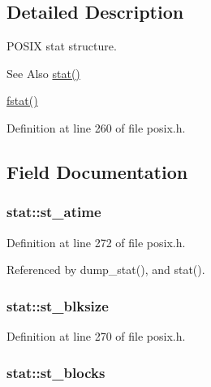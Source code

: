 \subsection{Detailed Description}
P\-O\-S\-I\-X stat structure. 

\begin{DoxySeeAlso}{See Also}
\hyperlink{posix_8c_abef70bf7a4af8a1f4998db0035c51781}{stat()} 

\hyperlink{posix_8h_a85e86e70773c0a204346f965272bd364}{fstat()} 
\end{DoxySeeAlso}


Definition at line 260 of file posix.\-h.



\subsection{Field Documentation}
\hypertarget{structstat_ab74d1e7e345e88b9d0fb2688a97cba64}{
\subsubsection[{st\-\_\-atime}]{ stat\-::st\-\_\-atime}}\label{structstat_ab74d1e7e345e88b9d0fb2688a97cba64}


Definition at line 272 of file posix.\-h.



Referenced by dump\-\_\-stat(), and stat().

\hypertarget{structstat_a38d474e1ae3cf6fbdde89ac3c3e308f1}{
\subsubsection[{st\-\_\-blksize}]{ stat\-::st\-\_\-blksize}}\label{structstat_a38d474e1ae3cf6fbdde89ac3c3e308f1}


Definition at line 270 of file posix.\-h.

\hypertarget{structstat_a42dd716b2f9234f961d949fc9500eefb}{
\subsubsection[{st\-\_\-blocks}]{ stat\-::st\-\_\-blocks}}\label{structstat_a42dd716b2f9234f961d949fc9500eefb}


